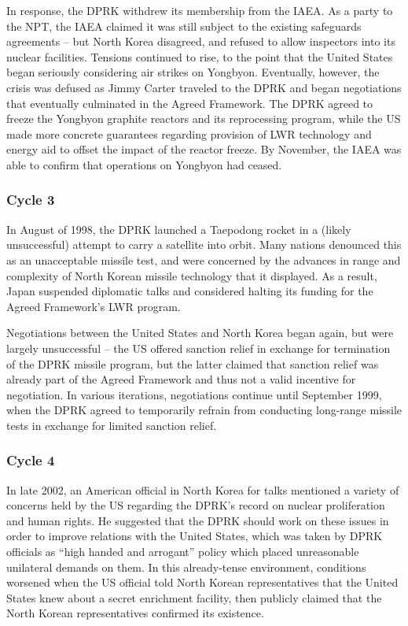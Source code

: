 \documentclass{article}
\begin{document}
In response, the DPRK withdrew its membership from the IAEA. As a party to the NPT, the IAEA claimed it was still subject to the existing safeguards agreements – but North Korea disagreed, and refused to allow inspectors into its nuclear facilities\cite{iaea09}. Tensions continued to rise, to the point that the United States began seriously considering air strikes on Yongbyon\cite{jun}. Eventually, however, the crisis was defused as Jimmy Carter traveled to the DPRK and began negotiations that eventually culminated in the Agreed Framework\cite{nti15}. The DPRK agreed to freeze the Yongbyon graphite reactors and its reprocessing program, while the US made more concrete guarantees regarding provision of LWR technology and energy aid to offset the impact of the reactor freeze\cite{agreed}. By November, the IAEA was able to confirm that operations on Yongbyon had ceased\cite{davenport}.

\subsubsection{Cycle 3}

In August of 1998, the DPRK launched a Taepodong rocket in a (likely unsuccessful) attempt to carry a satellite into orbit\cite{orfall}. Many nations denounced this as an unacceptable missile test, and were concerned by the advances in range and complexity of North Korean missile technology that it displayed\cite{orfall}. As a result, Japan suspended diplomatic talks and considered halting its funding for the Agreed Framework’s LWR program\cite{orfall}.

Negotiations between the United States and North Korea began again, but were largely unsuccessful – the US offered sanction relief in exchange for termination of the DPRK missile program, but the latter claimed that sanction relief was already part of the Agreed Framework and thus not a valid incentive for negotiation\cite{davenport}. In various iterations, negotiations continue until September 1999, when the DPRK agreed to temporarily refrain from conducting long-range missile tests in exchange for limited sanction relief\cite{davenport}.

\subsubsection{Cycle 4}

In late 2002, an American official in North Korea for talks mentioned a variety of concerns held by the US regarding the DPRK’s record on nuclear proliferation and human rights\cite{davenport}. He suggested that the DPRK should work on these issues in order to improve relations with the United States, which was taken by DPRK officials as “high handed and arrogant” policy which placed unreasonable unilateral demands on them\cite{kcna3}. In this already-tense environment, conditions worsened when the US official told North Korean representatives that the United States knew about a secret enrichment facility, then publicly claimed that the North Korean representatives confirmed its existence\cite{davenport}. 
\end{document}
